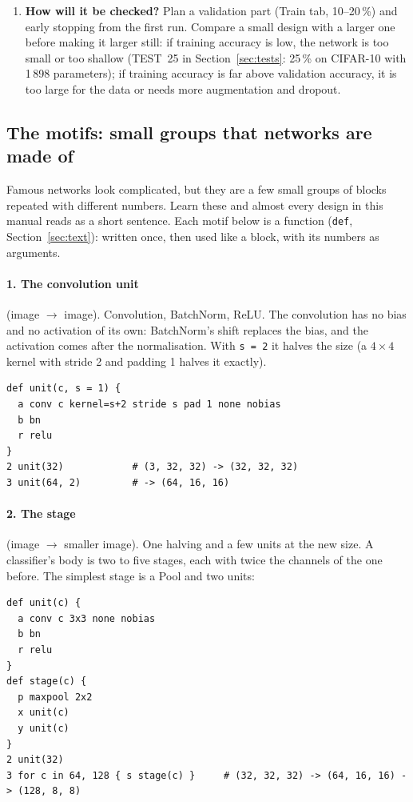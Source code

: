 \begin{enumerate}[leftmargin=*]
        small batches) after each convolution, and residual connections: an  that adds a block's input to its output, so each
        block only has to learn a correction.
  \item \textbf{How will it be checked?} Plan a validation part (Train tab, 10--20\,\%) and early stopping from the first run. Compare a
        small design with a larger one before making it larger still: if training accuracy is low, the network is too small or too
        shallow (TEST~25 in Section~\ref{sec:tests}: 25\,\% on CIFAR-10 with 1\,898 parameters); if training accuracy is far above
        validation accuracy, it is too large for the data or needs more augmentation and dropout.
\end{enumerate}

\subsection{The motifs: small groups that networks are made of}
\label{sec:build-motifs}
Famous networks look complicated, but they are a few small groups of blocks repeated with different numbers. Learn these and almost
every design in this manual reads as a short sentence. Each motif below is a function (\texttt{def}, Section~\ref{sec:text}): written
once, then used like a block, with its numbers as arguments.

\paragraph{1. The convolution unit} (image $\rightarrow$ image). Convolution, BatchNorm, ReLU. The convolution has no bias and no activation
of its own: BatchNorm's shift replaces the bias, and the activation comes after the normalisation. With \texttt{s = 2} it halves the size
(a $4\times4$ kernel with stride 2 and padding 1 halves it exactly).
\begin{verbatim}
def unit(c, s = 1) {
  a conv c kernel=s+2 stride s pad 1 none nobias
  b bn
  r relu
}
2 unit(32)            # (3, 32, 32) -> (32, 32, 32)
3 unit(64, 2)         # -> (64, 16, 16)
\end{verbatim}

\paragraph{2. The stage} (image $\rightarrow$ smaller image). One halving and a few units at the new size. A classifier's body is two to
five stages, each with twice the channels of the one before. The simplest stage is a Pool and two units:
\begin{verbatim}
def unit(c) {
  a conv c 3x3 none nobias
  b bn
  r relu
}
def stage(c) {
  p maxpool 2x2
  x unit(c)
  y unit(c)
}
2 unit(32)
3 for c in 64, 128 { s stage(c) }     # (32, 32, 32) -> (64, 16, 16) -> (128, 8, 8)
\end{verbatim}

